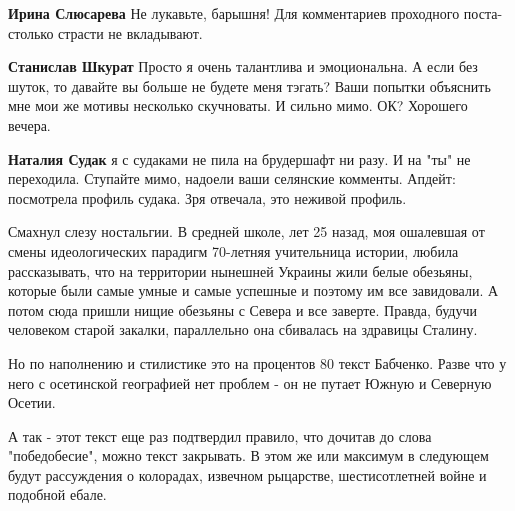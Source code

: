 \begin{itemize}
\begin{itemize}
 
\textbf{Ирина Слюсарева} Не лукавьте, барышня! Для комментариев проходного поста-столько страсти не вкладывают.🤣

 
\textbf{Станислав Шкурат} Просто я очень талантлива и эмоциональна. \Smiley[1.0][yellow] А если без шуток, то давайте вы больше не будете меня тэгать? Ваши попытки объяснить мне мои же мотивы несколько скучноваты. И сильно мимо. ОК? Хорошего вечера.

 
\textbf{Наталия Судак} я с судаками не пила на брудершафт ни разу. И на "ты" не переходила. Ступайте мимо, надоели ваши селянские комменты. Апдейт: посмотрела профиль судака. Зря отвечала, это неживой профиль.

\end{itemize}

 

Смахнул слезу ностальгии. В средней школе, лет 25 назад, моя ошалевшая от смены
идеологических парадигм 70-летняя учительница истории, любила рассказывать, что
на территории нынешней Украины жили белые обезьяны, которые были самые умные и
самые успешные и поэтому им все завидовали. А потом сюда пришли нищие обезьяны
с Севера и все заверте. Правда, будучи человеком старой закалки, параллельно
она сбивалась на здравицы Сталину.

Но по наполнению и стилистике это на процентов 80 текст Бабченко. Разве что у
него с осетинской географией нет проблем - он не путает Южную и Северную
Осетии.

А так - этот текст еще раз подтвердил правило, что дочитав до слова
"победобесие", можно текст закрывать. В этом же или максимум в следующем будут
рассуждения о колорадах, извечном рыцарстве, шестисотлетней войне и подобной
ебале.


\end{itemize}
